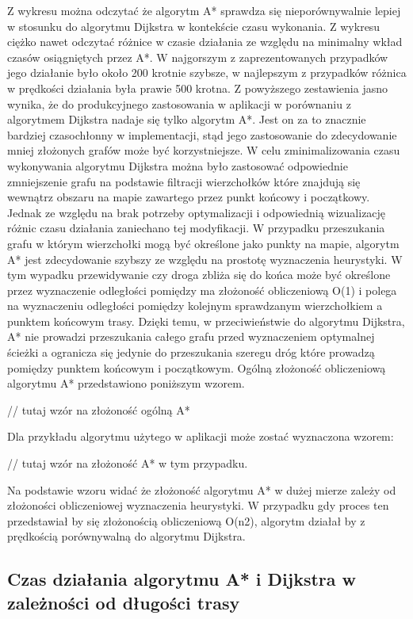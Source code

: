 Z wykresu można odczytać że algorytm A* sprawdza się nieporównywalnie lepiej w stosunku do algorytmu Dijkstra w kontekście czasu wykonania. Z wykresu ciężko nawet odczytać różnice w czasie działania ze względu na minimalny wkład czasów osiągniętych przez A*. W najgorszym z zaprezentowanych przypadków jego działanie było około 200 krotnie szybsze, w najlepszym z przypadków różnica w prędkości działania była prawie 500 krotna. Z powyższego zestawienia jasno wynika, że do produkcyjnego zastosowania w aplikacji w porównaniu z algorytmem Dijkstra nadaje się tylko algorytm A*. Jest on za to znacznie bardziej czasochłonny w implementacji, stąd jego zastosowanie do zdecydowanie mniej złożonych grafów może być korzystniejsze. W celu zminimalizowania czasu wykonywania algorytmu Dijkstra można było zastosować odpowiednie zmniejszenie grafu na podstawie filtracji wierzchołków które znajdują się wewnątrz obszaru na mapie zawartego przez punkt końcowy i początkowy. Jednak ze względu na brak potrzeby optymalizacji i odpowiednią wizualizację różnic czasu działania zaniechano tej modyfikacji.
W przypadku przeszukania grafu w którym wierzchołki mogą być określone jako punkty na mapie, algorytm A* jest zdecydowanie szybszy ze względu na prostotę wyznaczenia heurystyki. W tym wypadku przewidywanie czy droga zbliża się do końca może być określone przez wyznaczenie odległości pomiędzy ma złożoność obliczeniową O(1) i polega na wyznaczeniu odległości pomiędzy kolejnym sprawdzanym wierzchołkiem a punktem końcowym trasy. Dzięki temu, w przeciwieństwie do algorytmu Dijkstra, A* nie prowadzi przeszukania całego grafu przed wyznaczeniem optymalnej ścieżki a ogranicza się jedynie do przeszukania szeregu dróg które prowadzą pomiędzy punktem końcowym i początkowym.
Ogólną złożoność obliczeniową algorytmu A* przedstawiono poniższym wzorem.

// tutaj wzór na złożoność ogólną A*

Dla przykładu algorytmu użytego w aplikacji może zostać wyznaczona wzorem:

// tutaj wzór na złożoność A* w tym przypadku.

Na podstawie wzoru widać że złożoność algorytmu A* w dużej mierze zależy od złożoności obliczeniowej wyznaczenia heurystyki. W przypadku gdy proces ten przedstawiał by się złożonością obliczeniową O(n2), algorytm działał by z prędkością porównywalną do algorytmu Dijkstra.

\subsection{Czas działania algorytmu A* i Dijkstra w zależności od długości trasy}

